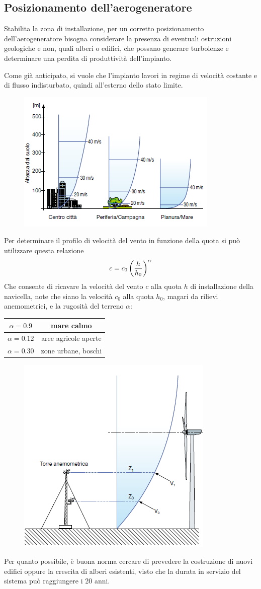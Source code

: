 \documentclass[a4paper, 15pt]{article}
\begin{document}
\subsection{Posizionamento dell'aerogeneratore}
\begin{adjustwidth}{2in}{}
	Stabilita la zona di installazione, per un corretto
	posizionamento dell’aerogeneratore bisogna
	considerare la presenza di eventuali ostruzioni
	geologiche e non, quali alberi o edifici, che
	possano generare turbolenze e determinare una
	perdita di produttività dell’impianto. \newline 
	
	Come già anticipato, si vuole che l'impianto lavori in regime di velocità costante e di flusso indisturbato, quindi all'esterno dello stato limite. 
	\begin{figure}[H]
		\centering
		\includegraphics[width=0.5\linewidth]{immagini/eoliche11}
		\label{fig:eoliche11}
	\end{figure}	
	Per determinare il profilo di velocità del vento in funzione
	della quota si può utilizzare questa relazione
	\[ c = c_0\left(h\over h_0\right)^\alpha\]
	Che consente
	di ricavare la velocità del vento $c$ alla quota $h$ di installazione della navicella, note che
	siano la velocità $c_0$ alla quota $h_0$, magari da rilievi anemometrici,
	e la rugosità del terreno $\alpha$:
	
	\begin{tabular}{|c|c|}
		\hline
		 $\alpha=0.9$   &      mare calmo      \\ \hline
		 $\alpha=0.12$  & aree agricole aperte \\ \hline
		$\alpha = 0.30$ & zone urbane, boschi  \\ \hline
	\end{tabular}
	\begin{figure}[H]
		\centering
		\includegraphics[width=0.3\linewidth]{immagini/eoliche12}
		\label{fig:eoliche12}
	\end{figure}	
	Per quanto possibile, è buona norma cercare di prevedere
	la costruzione di nuovi edifici oppure la
	crescita di alberi esistenti, visto che la durata in
	servizio del sistema può raggiungere i 20 anni.
	

\end{adjustwidth}
\end{document}
